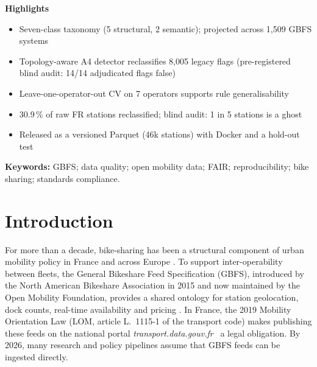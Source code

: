 \documentclass[11pt,a4paper]{article}
\newenvironment{highlights}{%
  \par\noindent\textsf{\bfseries\large Highlights}\par\smallskip
  \begin{itemize}[leftmargin=1.4em,itemsep=0.15em,topsep=0.2em]}{%
  \end{itemize}\par\medskip}
\begin{document}
\begin{highlights}
\item Seven-class taxonomy (5 structural, 2 semantic); projected across 1{,}509 GBFS systems
\item Topology-aware A4 detector reclassifies 8{,}005 legacy flags (pre-registered blind audit: 14/14 adjudicated flags false)
\item Leave-one-operator-out CV on 7 operators supports rule generalisability
\item 30.9\,\% of raw FR stations reclassified; blind audit: 1 in 5 stations is a ghost
\item Released as a versioned Parquet (46k stations) with Docker and a hold-out test
\end{highlights}

\noindent\textbf{Keywords:} GBFS; data quality; open mobility data; FAIR; reproducibility; bike sharing; standards compliance.


\section{Introduction}

For more than a decade, bike-sharing has been a structural component of
urban mobility policy in France and across Europe
\cite{DeMaio2009,Shaheen2010,Pucher2010Infrastructure}. To support inter-operability between
fleets, the General Bikeshare Feed Specification (GBFS), introduced by the
North American Bikeshare Association in 2015 and now maintained by the
Open Mobility Foundation, provides a shared ontology for station
geolocation, dock counts, real-time availability and pricing
\cite{Mobi2024,OMF2023}. In France, the 2019 Mobility Orientation Law
\cite{LOM2019} (LOM, article L.~1115-1 of the transport code) makes
publishing these feeds on the national portal
\emph{transport.data.gouv.fr}~\cite{PAN2017} a legal obligation. By 2026,
many research and policy pipelines assume that GBFS feeds can be ingested
directly.
\end{document}
